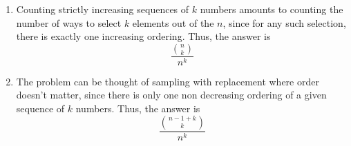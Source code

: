 \begin{enumerate}[label=(\alph*)]
\item Counting strictly increasing sequences of $k$ numbers amounts to counting the number of ways to select $k$ elements out of the $n$, since for any such selection, there is exactly one increasing ordering. Thus, the answer is 
$$\frac{\binom{n}{k}}{n^k}$$

\item The problem can be thought of sampling with replacement where order doesn't matter, since there is only one non decreasing ordering of a given sequence of $k$ numbers. Thus, the answer is
$$\frac{\binom{n-1+k}{k}}{n^k}$$

\end{enumerate}